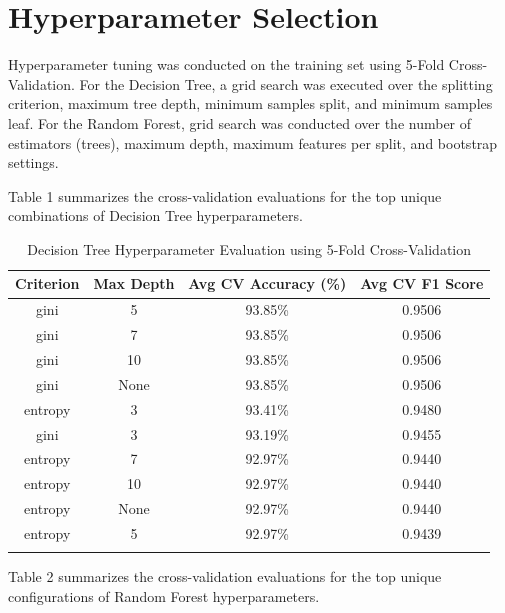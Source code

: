\documentclass[12pt,a4paper]{article}
\begin{document}
\section{Hyperparameter Selection}
Hyperparameter tuning was conducted on the training set using 5-Fold Cross-Validation. For the Decision Tree, a grid search was executed over the splitting criterion, maximum tree depth, minimum samples split, and minimum samples leaf. For the Random Forest, grid search was conducted over the number of estimators (trees), maximum depth, maximum features per split, and bootstrap settings.

Table 1 summarizes the cross-validation evaluations for the top unique combinations of Decision Tree hyperparameters.

\begin{longtable}{|c|c|c|c|}
\hline
\textbf{Criterion} & \textbf{Max Depth} & \textbf{Avg CV Accuracy (\%)} & \textbf{Avg CV F1 Score} \\ \hline
\endhead
gini & 5 & 93.85\% & 0.9506 \\ \hline
gini & 7 & 93.85\% & 0.9506 \\ \hline
gini & 10 & 93.85\% & 0.9506 \\ \hline
gini & None & 93.85\% & 0.9506 \\ \hline
entropy & 3 & 93.41\% & 0.9480 \\ \hline
gini & 3 & 93.19\% & 0.9455 \\ \hline
entropy & 7 & 92.97\% & 0.9440 \\ \hline
entropy & 10 & 92.97\% & 0.9440 \\ \hline
entropy & None & 92.97\% & 0.9440 \\ \hline
entropy & 5 & 92.97\% & 0.9439 \\ \hline
\caption{Decision Tree Hyperparameter Evaluation using 5-Fold Cross-Validation}
\label{tab:dt_tuning}
\end{longtable}

Table 2 summarizes the cross-validation evaluations for the top unique configurations of Random Forest hyperparameters.
\end{document}
